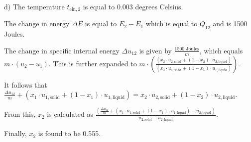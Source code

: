 d) The temperature \( t_{\text{ein},2} \) is equal to 0.003 degrees Celsius.

The change in energy \( \Delta E \) is equal to \( E_2 - E_1 \) which is equal to \( Q_{12} \) and is 1500 Joules.

The change in specific internal energy \( \Delta u_{12} \) is given by \( \frac{1500 \text{ Joules}}{m} \), which equals \( m \cdot (u_2 - u_1) \). This is further expanded to \( m \cdot \left( \frac{(x_2 \cdot u_{2,\text{solid}} + (1 - x_2) \cdot u_{2,\text{liquid}})}{(x_1 \cdot u_{1,\text{solid}} + (1 - x_1) \cdot u_{1,\text{liquid}})} \right) \).

It follows that \( \frac{\Delta u_{12}}{m} + (x_1 \cdot u_{1,\text{solid}} + (1 - x_1) \cdot u_{1,\text{liquid}}) = x_2 \cdot u_{2,\text{solid}} + (1 - x_2) \cdot u_{2,\text{liquid}} \).

From this, \( x_2 \) is calculated as \( \frac{\left( \frac{\Delta u_{12}}{m} + (x_1 \cdot u_{1,\text{solid}} + (1 - x_1) \cdot u_{1,\text{liquid}}) - u_{2,\text{liquid}} \right)}{u_{2,\text{solid}} - u_{2,\text{liquid}}} \).

Finally, \( x_2 \) is found to be 0.555.